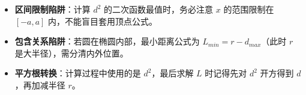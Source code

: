\begin{trapbox}
\begin{itemize}
    \item \textbf{区间限制陷阱}：计算 $d^2$ 的二次函数最值时，务必注意 $x$ 的范围限制在 $[-a, a]$ 内，不能盲目套用顶点公式。
    \item \textbf{包含关系陷阱}：若圆在椭圆内部，最小距离公式为 $L_{min} = r - d_{max}$（此时 $r$ 是大半径），需分清内外位置。
    \item \textbf{平方根转换}：计算过程中使用的是 $d^2$，最后求解 $L$ 时记得先对 $d^2$ 开方得到 $d$，再加减半径 $r$。
\end{itemize}
\end{trapbox}